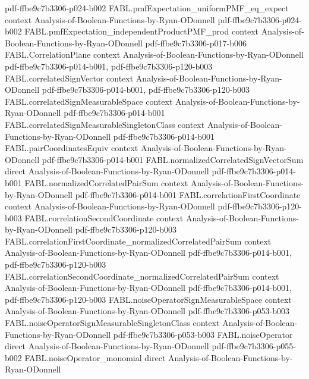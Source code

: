 \begin{theorem}
  {pdf-ffbe9c7b3306-p024-b002}
\proofstep
  {FABL.pmfExpectation_uniformPMF_eq_expect}
  {context}
  {Analysis-of-Boolean-Functions-by-Ryan-ODonnell}
  {pdf-ffbe9c7b3306-p024-b002}
\proofstep
  {FABL.pmfExpectation_independentProductPMF_prod}
  {context}
  {Analysis-of-Boolean-Functions-by-Ryan-ODonnell}
  {pdf-ffbe9c7b3306-p017-b006}
\proofstep
  {FABL.CorrelationPlane}
  {context}
  {Analysis-of-Boolean-Functions-by-Ryan-ODonnell}
  {pdf-ffbe9c7b3306-p014-b001,
    pdf-ffbe9c7b3306-p120-b003}
\proofstep
  {FABL.correlatedSignVector}
  {context}
  {Analysis-of-Boolean-Functions-by-Ryan-ODonnell}
  {pdf-ffbe9c7b3306-p014-b001,
    pdf-ffbe9c7b3306-p120-b003}
\proofstep
  {FABL.correlatedSignMeasurableSpace}
  {context}
  {Analysis-of-Boolean-Functions-by-Ryan-ODonnell}
  {pdf-ffbe9c7b3306-p014-b001}
\proofstep
  {FABL.correlatedSignMeasurableSingletonClass}
  {context}
  {Analysis-of-Boolean-Functions-by-Ryan-ODonnell}
  {pdf-ffbe9c7b3306-p014-b001}
\proofstep
  {FABL.pairCoordinatesEquiv}
  {context}
  {Analysis-of-Boolean-Functions-by-Ryan-ODonnell}
  {pdf-ffbe9c7b3306-p014-b001}
\proofstep
  {FABL.normalizedCorrelatedSignVectorSum}
  {direct}
  {Analysis-of-Boolean-Functions-by-Ryan-ODonnell}
  {pdf-ffbe9c7b3306-p014-b001}
\proofstep
  {FABL.normalizedCorrelatedPairSum}
  {context}
  {Analysis-of-Boolean-Functions-by-Ryan-ODonnell}
  {pdf-ffbe9c7b3306-p014-b001}
\proofstep
  {FABL.correlationFirstCoordinate}
  {context}
  {Analysis-of-Boolean-Functions-by-Ryan-ODonnell}
  {pdf-ffbe9c7b3306-p120-b003}
\proofstep
  {FABL.correlationSecondCoordinate}
  {context}
  {Analysis-of-Boolean-Functions-by-Ryan-ODonnell}
  {pdf-ffbe9c7b3306-p120-b003}
\proofstep
  {FABL.correlationFirstCoordinate_normalizedCorrelatedPairSum}
  {context}
  {Analysis-of-Boolean-Functions-by-Ryan-ODonnell}
  {pdf-ffbe9c7b3306-p014-b001,
    pdf-ffbe9c7b3306-p120-b003}
\proofstep
  {FABL.correlationSecondCoordinate_normalizedCorrelatedPairSum}
  {context}
  {Analysis-of-Boolean-Functions-by-Ryan-ODonnell}
  {pdf-ffbe9c7b3306-p014-b001,
    pdf-ffbe9c7b3306-p120-b003}
\proofstep
  {FABL.noiseOperatorSignMeasurableSpace}
  {context}
  {Analysis-of-Boolean-Functions-by-Ryan-ODonnell}
  {pdf-ffbe9c7b3306-p053-b003}
\proofstep
  {FABL.noiseOperatorSignMeasurableSingletonClass}
  {context}
  {Analysis-of-Boolean-Functions-by-Ryan-ODonnell}
  {pdf-ffbe9c7b3306-p053-b003}
\proofstep
  {FABL.noiseOperator}
  {direct}
  {Analysis-of-Boolean-Functions-by-Ryan-ODonnell}
  {pdf-ffbe9c7b3306-p055-b002}
\proofstep
  {FABL.noiseOperator_monomial}
  {direct}
  {Analysis-of-Boolean-Functions-by-Ryan-ODonnell}

\end{theorem}
